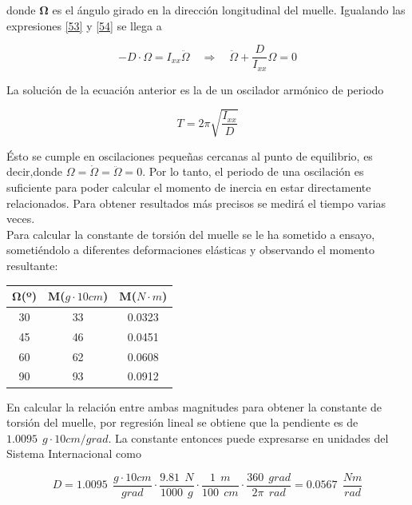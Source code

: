 \documentclass[twoside,11pt]{report}
\begin{document}
donde $\mathbf{\Omega}$ es el ángulo girado en la dirección longitudinal del muelle. Igualando las expresiones \ref{53} y \ref{54} se llega a 

\begin{equation}
-D \cdot \Omega = I_{xx}\ddot{\Omega}\quad \Longrightarrow \quad \ddot{\Omega}+\frac{D}{I_{xx}}\Omega =0 
\end{equation}

La solución de la ecuación anterior es la de un oscilador armónico de periodo 

\begin{equation}
T=2\pi \sqrt{\frac{I_{xx}}{D}}
\end{equation}

Ésto se cumple en oscilaciones pequeñas cercanas al punto de equilibrio, es decir,donde $\Omega=\dot{\Omega}=\ddot{\Omega}=0$. Por lo tanto, el periodo de una oscilación es suficiente para poder calcular el momento de inercia en estar directamente relacionados. Para obtener resultados más precisos se medirá el tiempo varias veces. \\

Para calcular la constante de torsión del muelle se le ha sometido a ensayo, sometiéndolo a diferentes deformaciones elásticas y observando el momento resultante:
\begin{center}
\begin{tabular}{|c|c|c|}
\hline
$\mathbf{\Omega}$(º) & $\mathbf{M}$($g \cdot 10cm$) & $\mathbf{M}$($N \cdot m$) \\
\hline 
\hline 
30 & 33 & 0.0323 \\
45 & 46 & 0.0451 \\
60 & 62 & 0.0608 \\
90 & 93 & 0.0912 \\
\hline 
\end{tabular}
\end{center}

En calcular la relación entre ambas magnitudes para obtener la constante de torsión del muelle, por regresión lineal se obtiene que la pendiente es de $1.0095\>\>g\cdot10cm/grad$. La constante entonces puede expresarse en unidades del Sistema Internacional como 

\begin{equation}
D=1.0095 \>\> \frac{g\cdot10cm}{grad}\cdot\frac{9.81 \>\> N}{1000 \>\> g} \cdot \frac{1 \>\> m}{100 \>\> cm} \cdot \frac{360 \>\> grad}{2\pi \>\> rad} = 0.0567 \>\> \frac{Nm}{rad}
\end{equation}
\end{document}
